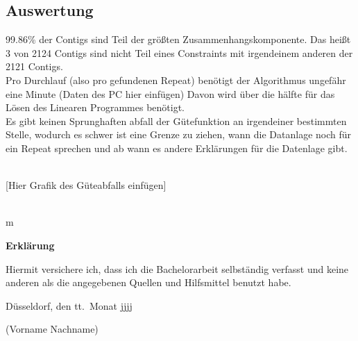 \documentclass[12pt,ngerman,titlepage,a4paper]{article}
\begin{document}
\subsection{Auswertung}
99.86\% der Contigs sind Teil der größten Zusammenhangskomponente. Das heißt 3 von 2124 Contigs sind nicht Teil eines Constraints mit irgendeinem anderen der 2121 Contigs.\\
Pro Durchlauf (also pro gefundenen Repeat) benötigt der Algorithmus ungefähr eine Minute (Daten des PC hier einfügen) Davon wird über die hälfte für das Lösen des Linearen Programmes benötigt.\\
Es gibt keinen Sprunghaften abfall der Gütefunktion an irgendeiner bestimmten Stelle, wodurch es schwer ist eine Grenze zu ziehen, wann die Datanlage noch für ein Repeat sprechen und ab wann es andere Erklärungen für die Datenlage gibt. \\\\
\begin{center}
[Hier Grafik des Güteabfalls einfügen]\\ \ \\
\end{center}
m
\pagebreak\noindent

\textbf{\LARGE Erkl\"arung}

\bigskip\bigskip
\noindent 
Hiermit versichere ich, dass ich die   Bachelorarbeit selbst\"andig verfasst und keine
anderen als die angegebenen Quellen und Hilfsmittel benutzt habe.

\bigskip
\noindent
D\"usseldorf, den tt.\ Monat jjjj

\bigskip\bigskip\bigskip
\noindent
(Vorname Nachname)
\end{document}
